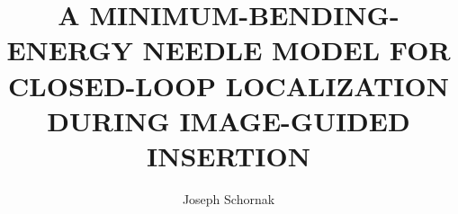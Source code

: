 \documentclass[12pt,letterpaper, oneside,final]{thesisClass}
\begin{document}
\title{A MINIMUM-BENDING-ENERGY NEEDLE MODEL FOR CLOSED-LOOP LOCALIZATION DURING IMAGE-GUIDED INSERTION}
\author{Joseph Schornak}
\dissertation
\doctorphilosophy
\copyrightnotice






% 


\begin{spacing}{1}
\def\dsp{\def\baselinestretch{1.25}\large\normalsize}


% 

\end{spacing}
\end{document}
